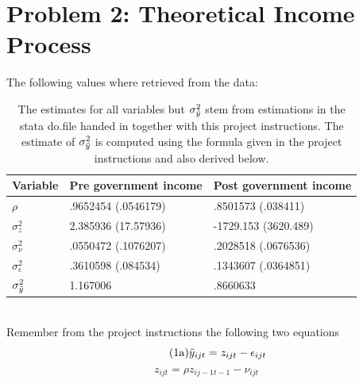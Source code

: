 \documentclass[12pt,a4paper]{article}
\begin{document}
\clearpage

\section*{Problem 2: Theoretical Income Process}

The following values where retrieved from the data:

\begin{table}[h]
\begin{tabular}{|l|l|l|}
\hline
\textbf{Variable} & \textbf{Pre government income} & \textbf{Post government income}  \\ \hline
$\rho$                        &   .9652454 (.0546179)  &  .8501573  (.038411)         \\ \hline
$\sigma^2_z$                  &   2.385936 (17.57936)  &  -1729.153 (3620.489)        \\ \hline
$\sigma^2_\nu$                &   .0550472 (.1076207)  &   .2028518 (.0676536)        \\ \hline
$\sigma^2_\epsilon$           &   .3610598  (.084534)  &   .1343607 (.0364851)        \\ \hline
$\sigma^2_{\Tilde{y}}$        &   1.167006             &   .8660633                   \\ \hline
\end{tabular}
\caption{The estimates for all variables but $\sigma^2_{\Tilde{y}}$ stem from estimations in the stata do.file handed in together with this project instructions. The estimate of $\sigma^2_{\Tilde{y}}$ is computed using the formula given in the project instructions and also derived below.}
\end{table}

\\

Remember from the project instructions the following two equations
\begin{equation}\tag{1a}
    \Tilde{y}_{ijt} = z_{ijt} - \epsilon_{ijt}
\end{equation}
\begin{equation}\tag{1b}
    z_{ijt} = \rho z_{ij-1t-1} - \nu_{ijt}
\end{equation}
\end{document}
